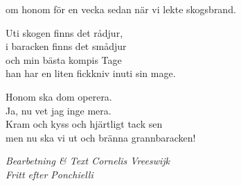 om honom för en vecka sedan när vi lekte skogsbrand.\par
\vspace{10pt}
Uti skogen finns det rådjur,\\
i baracken finns det smådjur\\
och min bästa kompis Tage\\
han har en liten fickkniv inuti sin mage.\par
\vspace{10pt}
Honom ska dom operera.\\
Ja, nu vet jag inge mera.\\
Kram och kyss och hjärtligt tack sen\\
men nu ska vi ut och bränna grannbaracken!\par
\vspace{10pt}
{\footnotesize\textit{Bearbetning \& Text Cornelis Vreeswijk \\ Fritt efter Ponchielli}}
